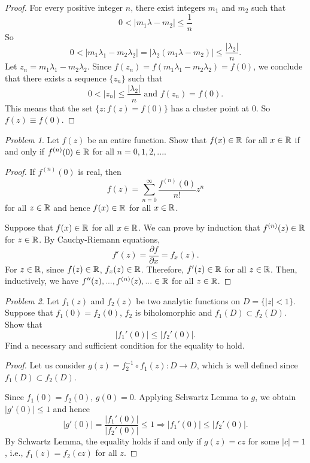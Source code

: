 \documentclass[11pt]{amsart}
\theoremstyle{remark}
\newtheorem{prob}{Problem}[section]
\theoremstyle{definition}
\numberwithin{equation}{section}
\begin{document}
\begin{proof}
    For every positive integer $n$, there exist integers $m_1$ and $m_2$ such that
    \[
        0 < |m_1\lambda - m_2| \le \frac{1}n
    \]
    So
    \[
        0 < |m_1 \lambda_1 - m_2 \lambda_2| = |\lambda_2(m_1\lambda - m_2)| \le \frac{|\lambda_2|}n.
    \]
    Let $z_n = m_1\lambda_1 - m_2\lambda_2$.
    Since $f(z_n) = f(m_1 \lambda_1 - m_2 \lambda_2) = f(0)$, we conclude that there exists a sequence $\{z_n\}$ such that
    \[
        0 < |z_n| \le \frac{|\lambda_2|}n \text{ and }
        f(z_n) = f(0).
    \]
    This means that the set $\{z: f(z) = f(0)\}$ has a cluster point at $0$. So $f(z) \equiv f(0)$.
\end{proof}

\begin{prob}
    Let $f(z)$ be an entire function. Show that $f(x)\in {\mathbb R}$ for all $x\in {\mathbb R}$ if and only if $f^{(n)}(0)\in {\mathbb R}$ for all $n=0,1,2,...$.
\end{prob}

\begin{proof}
    If $f^{(n)}(0)$ is real, then
    \[
        f(z) = \sum_{n=0}^\infty \frac{f^{(n)}(0)}{n!} z^n
    \]
    for all $z\in {\mathbb R}$ and hence $f(x)\in {\mathbb R}$ for all $x\in {\mathbb R}$.

    Suppose that $f(x)\in {\mathbb R}$ for all $x\in {\mathbb R}$. We can prove by induction that
    $f^{(n)}(z)\in {\mathbb R}$ for $z\in {\mathbb R}$. By Cauchy-Riemann equations,
    \[
        f'(z) = \frac{\partial f}{\partial x} = f_x(z).
    \]
    For $z\in {\mathbb R}$, since $f(z)\in {\mathbb R}$, $f_x(z)\in {\mathbb R}$. Therefore, $f'(z)\in {\mathbb R}$ for all $z\in {\mathbb R}$. Then, inductively, we have $f''(z), ..., f^{(n)}(z), ...\in {\mathbb R}$ for all $z\in {\mathbb R}$.
\end{proof}

\begin{prob}\label{MATH506HW123PROB23}
    Let $f_1(z)$ and $f_2(z)$ be two analytic functions on $D = \{|z| < 1\}$. Suppose that $f_1(0) = f_2(0)$, $f_2$ is biholomorphic and
    $f_1(D) \subset f_2(D)$. Show that
    \[
        |f_1'(0)| \le |f_2'(0)|.
    \]
    Find a necessary and sufficient condition for the equality to hold.
\end{prob}

\begin{proof}
    Let us consider $g(z) = f_2^{-1} \circ f_1(z): D\to D$, which is well defined since $f_1(D)\subset f_2(D)$.

    Since $f_1(0) = f_2(0)$, $g(0) = 0$. Applying Schwartz Lemma to $g$, we obtain $|g'(0)| \le 1$ and hence
    \[
        |g'(0)| = \frac{|f_1'(0)|}{|f_2'(0)|} \le 1 \Rightarrow |f_1'(0)| \le |f_2'(0)|.
    \]
    By Schwartz Lemma, the equality holds if and only if $g(z) = cz$ for some $|c| = 1$, i.e.,
    $f_1(z) = f_2(cz)$ for all $z$.
\end{proof}
\end{document}

